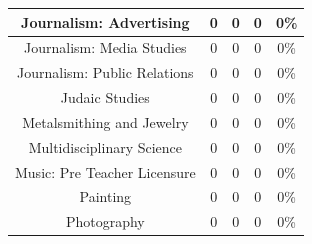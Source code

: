 \documentclass[10pt]{article}
\begin{document}
\begin{longtable}[c]{|ccccc|}
	\multicolumn{1}{|c|}{Journalism: Advertising}                    & \multicolumn{1}{c|}{0}                               & \multicolumn{1}{c|}{0}                                   & \multicolumn{1}{c|}{0}                  & 0\%                   \\ \hline
	\multicolumn{1}{|c|}{Journalism: Media Studies}                  & \multicolumn{1}{c|}{0}                               & \multicolumn{1}{c|}{0}                                   & \multicolumn{1}{c|}{0}                  & 0\%                   \\ \hline
	\multicolumn{1}{|c|}{Journalism: Public Relations}               & \multicolumn{1}{c|}{0}                               & \multicolumn{1}{c|}{0}                                   & \multicolumn{1}{c|}{0}                  & 0\%                   \\ \hline
	\multicolumn{1}{|c|}{Judaic Studies}                             & \multicolumn{1}{c|}{0}                               & \multicolumn{1}{c|}{0}                                   & \multicolumn{1}{c|}{0}                  & 0\%                   \\ \hline
	\multicolumn{1}{|c|}{Metalsmithing and Jewelry}                  & \multicolumn{1}{c|}{0}                               & \multicolumn{1}{c|}{0}                                   & \multicolumn{1}{c|}{0}                  & 0\%                   \\ \hline
	\multicolumn{1}{|c|}{Multidisciplinary Science}                  & \multicolumn{1}{c|}{0}                               & \multicolumn{1}{c|}{0}                                   & \multicolumn{1}{c|}{0}                  & 0\%                   \\ \hline
	\multicolumn{1}{|c|}{Music: Pre Teacher Licensure}               & \multicolumn{1}{c|}{0}                               & \multicolumn{1}{c|}{0}                                   & \multicolumn{1}{c|}{0}                  & 0\%                   \\ \hline
	\multicolumn{1}{|c|}{Painting}                                   & \multicolumn{1}{c|}{0}                               & \multicolumn{1}{c|}{0}                                   & \multicolumn{1}{c|}{0}                  & 0\%                   \\ \hline
	\multicolumn{1}{|c|}{Photography}                                & \multicolumn{1}{c|}{0}                               & \multicolumn{1}{c|}{0}                                   & \multicolumn{1}{c|}{0}                  & 0\%                   \\ \hline

\end{longtable}
\end{document}
